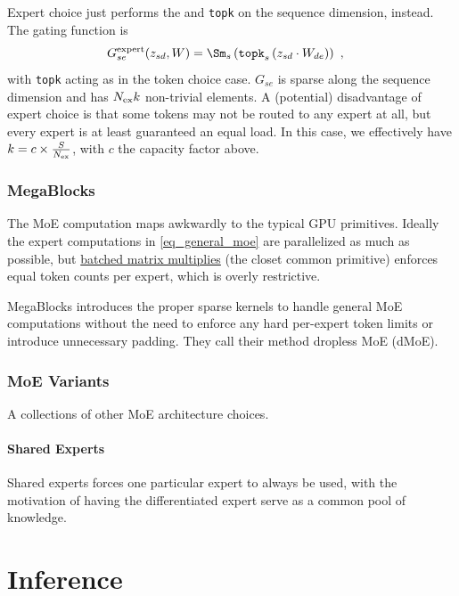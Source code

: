 \documentclass[11pt]{article}
\begin{document}
Expert choice just performs the \Sm and \texttt{topk} on the sequence dimension,
instead.  The gating function is
\begin{align}
    G  ^{ {\rm  expert} }_{ se }(z _{ sd }, W)  &= \Sm_{ s } \left ( \texttt{topk} _{ s } \left ( z _{ sd } \cdot W _{ de }  \right ) \right ) \ , \label{eq_expert_choice}
\end{align}
with \texttt{topk} acting as in the token choice case. $G _{ se } $ is sparse along the sequence
dimension and has $ N _{ {\rm ex} }k $ non-trivial elements. A (potential) disadvantage of expert
choice is that some tokens may not be routed to any expert at all, but every expert is at least
guaranteed an equal load. In this case, we effectively have $ k = c \times  \frac{ S }{ N _{ {\rm
ex} } } $, with $ c $ the capacity factor above.


\section{MegaBlocks}

The MoE computation maps awkwardly to the typical GPU primitives. Ideally the expert computations in
\eqref{eq_general_moe} are parallelized as much as possible, but
\href{https://pytorch.org/docs/stable/generated/torch.bmm.html}{batched matrix multiplies} (the
closet common primitive) enforces equal token counts per expert, which is overly restrictive.

MegaBlocks \cite{gale2022megablocksefficientsparsetraining} introduces the proper sparse kernels to
handle general MoE computations without the need to enforce any hard per-expert token limits or
introduce unnecessary padding. They call their method dropless MoE (dMoE).


\section{MoE Variants}

A collections of other MoE architecture choices.

\subsection{Shared Experts}


Shared experts forces one particular expert to always be used, with the motivation of having the
differentiated expert serve as a common pool of knowledge.


\newpage
\part{Inference}
\end{document}
